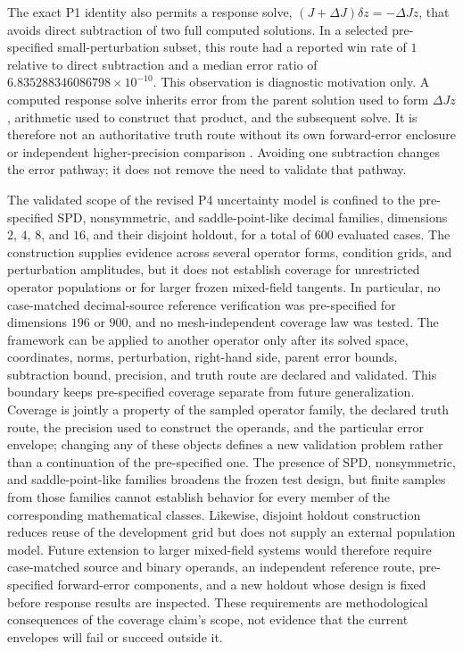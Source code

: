 \documentclass[preprint,12pt]{elsarticle}
\begin{document}
The exact P1 identity also permits a response solve, $(J+\Delta J)\delta z=-\Delta J z$, that avoids direct subtraction of two full computed solutions. In a selected pre-specified small-perturbation subset, this route had a reported win rate of $1$ relative to direct subtraction and a median error ratio of $6.835288346086798\allowbreak\times10^{-10}$. This observation is diagnostic motivation only. A computed response solve inherits error from the parent solution used to form $\Delta J z$, arithmetic used to construct that product, and the subsequent solve. It is therefore not an authoritative truth route without its own forward-error enclosure or independent higher-precision comparison \cite{S03,S11,S13}. Avoiding one subtraction changes the error pathway; it does not remove the need to validate that pathway.

The validated scope of the revised P4 uncertainty model is confined to the pre-specified SPD, nonsymmetric, and saddle-point-like decimal families, dimensions $2$, $4$, $8$, and $16$, and their disjoint holdout, for a total of 600 evaluated cases. The construction supplies evidence across several operator forms, condition grids, and perturbation amplitudes, but it does not establish coverage for unrestricted operator populations or for larger frozen mixed-field tangents. In particular, no case-matched decimal-source reference verification was pre-specified for dimensions $196$ or $900$, and no mesh-independent coverage law was tested. The framework can be applied to another operator only after its solved space, coordinates, norms, perturbation, right-hand side, parent error bounds, subtraction bound, precision, and truth route are declared and validated. This boundary keeps pre-specified coverage separate from future generalization. Coverage is jointly a property of the sampled operator family, the declared truth route, the precision used to construct the operands, and the particular error envelope; changing any of these objects defines a new validation problem rather than a continuation of the pre-specified one. The presence of SPD, nonsymmetric, and saddle-point-like families broadens the frozen test design, but finite samples from those families cannot establish behavior for every member of the corresponding mathematical classes. Likewise, disjoint holdout construction reduces reuse of the development grid but does not supply an external population model. Future extension to larger mixed-field systems would therefore require case-matched source and binary operands, an independent reference route, pre-specified forward-error components, and a new holdout whose design is fixed before response results are inspected. These requirements are methodological consequences of the coverage claim's scope, not evidence that the current envelopes will fail or succeed outside it.
\end{document}
